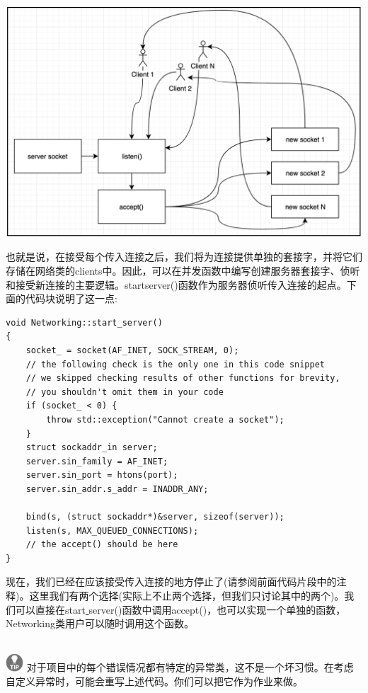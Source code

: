 \begin{center}
	\includegraphics[width=1.0\textwidth]{content/Section-2/Chapter-12/12}
\end{center}

也就是说，在接受每个传入连接之后，我们将为连接提供单独的套接字，并将它们存储在网络类的clients\underline{}中。因此，可以在并发函数中编写创建服务器套接字、侦听和接受新连接的主要逻辑。start\underline{}server()函数作为服务器侦听传入连接的起点。下面的代码块说明了这一点: \par

\begin{lstlisting}[caption={}]
void Networking::start_server()
{
	socket_ = socket(AF_INET, SOCK_STREAM, 0);
	// the following check is the only one in this code snippet
	// we skipped checking results of other functions for brevity,
	// you shouldn't omit them in your code
	if (socket_ < 0) {
		throw std::exception("Cannot create a socket");
	}
	struct sockaddr_in server;
	server.sin_family = AF_INET;
	server.sin_port = htons(port);
	server.sin_addr.s_addr = INADDR_ANY;
	
	bind(s, (struct sockaddr*)&server, sizeof(server));
	listen(s, MAX_QUEUED_CONNECTIONS);
	// the accept() should be here
}
\end{lstlisting}

现在，我们已经在应该接受传入连接的地方停止了(请参阅前面代码片段中的注释)。这里我们有两个选择(实际上不止两个选择，但我们只讨论其中的两个)。我们可以直接在start\underline{ }server()函数中调用accept()，也可以实现一个单独的函数，Networking类用户可以随时调用这个函数。 \par

\hspace*{\fill} \\ %
\includegraphics[width=0.05\textwidth]{images/tip}
对于项目中的每个错误情况都有特定的异常类，这不是一个坏习惯。在考虑自定义异常时，可能会重写上述代码。你们可以把它作为作业来做。 \par
\noindent\textbf{}\ \par

